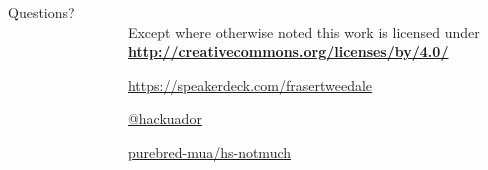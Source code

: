 \documentclass[ignorenonframetext,aspectratio=169]{beamer}
\begin{document}
\begin{frame}[plain]
\begin{columns}

  \begin{column}{.4\textwidth}
    \begin{center}
    {
        \Large Questions?\\
        \medskip
    }
    \end{center}


  \end{column}

  \begin{column}{.6\textwidth}
    \hypersetup{urlcolor=black}

    \setlength{\parskip}{.5em}

    { \centering

    
    \\
    { \scriptsize
    Except where otherwise noted this work is licensed under
    }\\
    { \footnotesize
      \textbf{\url{http://creativecommons.org/licenses/by/4.0/}}
    }

    \bigskip
    \large \tt

    \url{https://speakerdeck.com/frasertweedale}

    \href{https://twitter.com/hackuador}{@hackuador}

    \href{https://github.com/purebred-mua/hs-notmuch}{purebred-mua/hs-notmuch}

    }
  \end{column}

\end{columns}
\end{frame}
\end{document}
